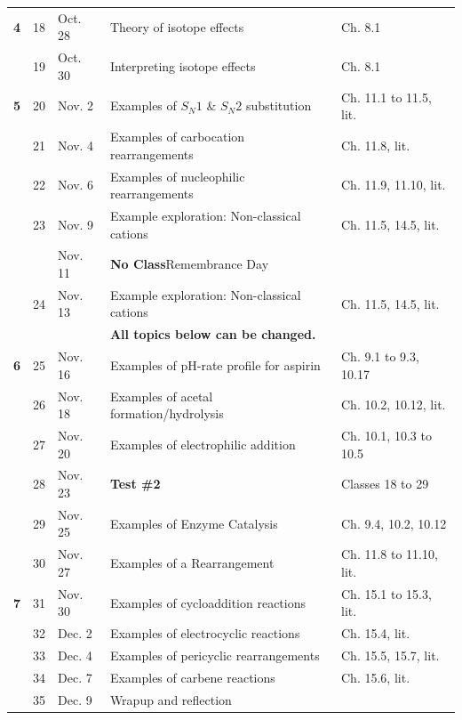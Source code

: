 \begin{longtable}{cp{0.8cm}p{1.8cm}p{7cm}p{3cm}}
 
\textbf{4}&18    &Oct. 28  & Theory of isotope effects                                 &Ch. 8.1                \\
      &19    &Oct. 30  & Interpreting isotope effects                              &Ch. 8.1                \\
\textbf{5}&20    &Nov. 2  & Examples of $S_N1$ \& $S_N2$ substitution  &Ch. 11.1 to 11.5, lit.   \\
      &21    &Nov. 4  & Examples of carbocation rearrangements                     &Ch. 11.8, lit.           \\
      &22    &Nov. 6  & Examples of nucleophilic rearrangements                    &Ch. 11.9, 11.10, lit.    \\
      &23    &Nov. 9   & Example exploration: Non-classical cations                &Ch. 11.5, 14.5, lit.     \\
      &      &Nov. 11   & \textbf{No Class}Remembrance Day                             &     \\
      &24    &Nov. 13   & Example exploration: Non-classical cations               &Ch. 11.5, 14.5, lit.  \\
      &      &         & \textbf{All topics below can be changed.}   &              \\
\textbf{6}&25    &Nov. 16  & Examples of pH-rate profile for aspirin                   &Ch. 9.1 to 9.3, 10.17 \\
      &26    &Nov. 18  & Examples of acetal formation/hydrolysis                   &Ch. 10.2, 10.12, lit.     \\
      &27    &Nov. 20  & Examples of electrophilic addition  &Ch. 10.1, 10.3 to 10.5\\
      &28    &Nov. 23  &\textbf{Test \#2}                                              &Classes 18 to 29        \\
      &29    &Nov. 25  & Examples of Enzyme Catalysis                              &Ch. 9.4, 10.2, 10.12   \\   
      &30    &Nov. 27  & Examples of a Rearrangement                               &Ch. 11.8 to 11.10, lit. \\
\textbf{7}&31    &Nov. 30  & Examples of cycloaddition reactions                       &Ch. 15.1 to 15.3, lit.   \\
      &32    &Dec. 2   & Examples of electrocyclic reactions                       &Ch. 15.4, lit.           \\
      &33    &Dec. 4   & Examples of pericyclic rearrangements                     &Ch. 15.5, 15.7, lit.     \\
      &34    &Dec. 7  & Examples of carbene reactions                              &Ch. 15.6, lit.           \\
      &35    &Dec. 9  & Wrapup and reflection                                      &           \\





\bottomrule
\end{longtable}


